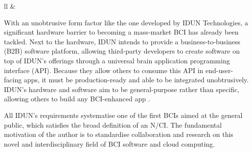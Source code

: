 \begin{table}[ht]
{\begin{tabular}{ll}
        &
                                                                                                                \\ \hline
    \end{tabular}%
  }
  \vspace{10pt}
  \caption{Axes label descriptions of the three-dimensionality for the definition of an N/CI as shown in \autoref{fig:nci-definition}.}
  \label{tab:nci-axis}
\end{table}

\newpage

With an unobtrusive form factor like the one developed by IDUN Technologies, a significant hardware barrier to becoming a mass-market BCI has already been tackled. Next to the hardware, IDUN intends to provide a business-to-business (B2B) software platform, allowing third-party developers to create software on top of IDUN’s offerings through a universal brain application programming interface (API). Because they allow others to consume this API in end-user-facing apps, it must be production-ready and able to be integrated unobtrusively. IDUN’s hardware and software aim to be general-purpose rather than specific, allowing others to build any BCI-enhanced app \citep{idun_guardian_nodate}.

All IDUN’s requirements systematise one of the first BCIs aimed at the general public, which satisfies the broad definition of an N/CI. The fundamental motivation of the author is to standardise collaboration and research on this novel and interdisciplinary field of BCI software and cloud computing.


